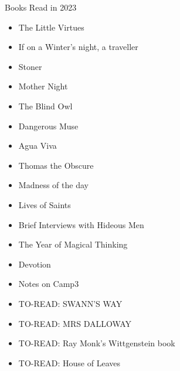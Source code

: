 Books Read in 2023
\begin{itemize}
    \item The Little Virtues
    \item If on a Winter's night, a traveller
    \item Stoner
    \item Mother Night
    \item The Blind Owl
    \item Dangerous Muse
    \item Agua Viva
    \item Thomas the Obscure
    \item Madness of the day
    \item Lives of Saints
    \item Brief Interviews with Hideous Men
    \item The Year of Magical Thinking
    \item Devotion
    \item Notes on Camp3
    \item TO-READ: SWANN'S WAY
    \item TO-READ: MRS DALLOWAY
    \item TO-READ: Ray Monk's Wittgenstein book
    \item TO-READ: House of Leaves
\end{itemize}